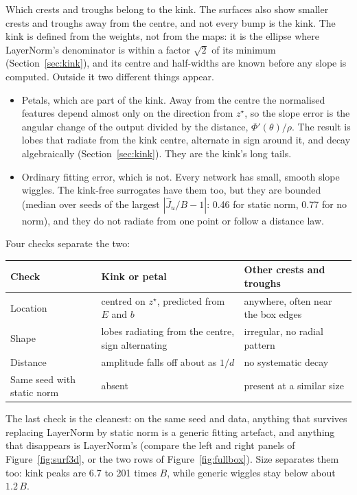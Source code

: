 \documentclass[11pt]{article}
\begin{document}
Which crests and troughs belong to the kink. The surfaces also show smaller crests and troughs away from the centre, and not every bump is the kink. The kink is defined from the weights, not from the maps: it is the ellipse where LayerNorm's denominator is within a factor $\sqrt2$ of its minimum (Section~\ref{sec:kink}), and its centre and half-widths are known before any slope is computed. Outside it two different things appear.
\begin{itemize}
\item Petals, which are part of the kink. Away from the centre the normalised features depend almost only on the direction from $z^\star$, so the slope error is the angular change of the output divided by the distance, $\Phi'(\theta)/\rho$. The result is lobes that radiate from the kink centre, alternate in sign around it, and decay algebraically (Section~\ref{sec:kink}). They are the kink's long tails.
\item Ordinary fitting error, which is not. Every network has small, smooth slope wiggles. The kink-free surrogates have them too, but they are bounded (median over seeds of the largest $|\hat J_u/B-1|$: 0.46 for static norm, 0.77 for no norm), and they do not radiate from one point or follow a distance law.
\end{itemize}
Four checks separate the two:
\begin{center}
\footnotesize
\begin{tabular}{>{\raggedright\arraybackslash}p{3.2cm}>{\raggedright\arraybackslash}p{5.6cm}>{\raggedright\arraybackslash}p{5.2cm}}
\toprule
Check & Kink or petal & Other crests and troughs \\
\midrule
Location & centred on $z^\star$, predicted from $E$ and $b$ & anywhere, often near the box edges \\
Shape & lobes radiating from the centre, sign alternating & irregular, no radial pattern \\
Distance & amplitude falls off about as $1/d$ & no systematic decay \\
Same seed with static norm & absent & present at a similar size \\
\bottomrule
\end{tabular}
\end{center}
The last check is the cleanest: on the same seed and data, anything that survives replacing LayerNorm by static norm is a generic fitting artefact, and anything that disappears is LayerNorm's (compare the left and right panels of Figure~\ref{fig:surf3d}, or the two rows of Figure~\ref{fig:fullbox}). Size separates them too: kink peaks are 6.7 to 201 times $B$, while generic wiggles stay below about $1.2\,B$.
\end{document}
